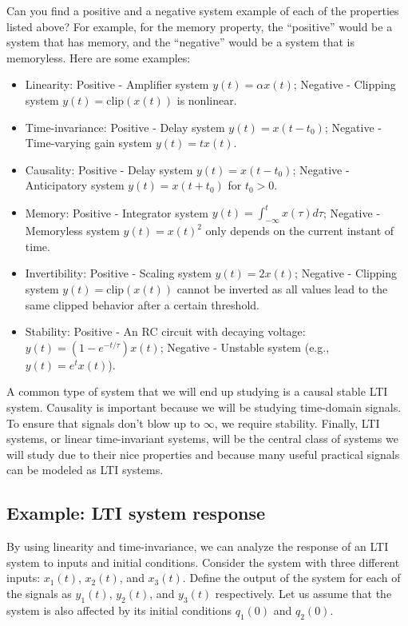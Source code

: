 \documentclass{ee102_notes}
\begin{document}
\begin{popquiz}
  Can you find a positive and a negative system example of each of the properties listed above? For example, for the memory property, the ``positive'' would be a system that has memory, and the ``negative'' would be a system that is memoryless. 
  \popqsplit
  Here are some examples:
  \begin{itemize}
      \item Linearity: Positive - Amplifier system $y(t) = \alpha x(t)$; Negative - Clipping system $y(t) = \text{clip}(x(t))$ is nonlinear.
      \item Time-invariance: Positive - Delay system $y(t) = x(t - t_0)$; Negative - Time-varying gain system $y(t) = t x(t)$.
      \item Causality: Positive - Delay system $y(t) = x(t - t_0)$; Negative - Anticipatory system $y(t) = x(t + t_0)$ for $t_0 >0$.
      \item Memory: Positive - Integrator system $y(t) = \int_{-\infty}^{t} x(\tau) d\tau$; Negative - Memoryless system $y(t) = x(t)^2$ only depends on the current instant of time.
      \item Invertibility: Positive - Scaling system $y(t) = 2x(t)$; Negative - Clipping system $y(t) = \text{clip}(x(t))$ cannot be inverted as all values lead to the same clipped behavior after a certain threshold.
      \item Stability: Positive - An RC circuit with decaying voltage: $y(t) = (1 - e^{-t/\tau}) x(t)$; Negative - Unstable system (e.g., $y(t) = e^{t} x(t)$).
  \end{itemize} 
\end{popquiz}
A common type of system that we will end up studying is a causal stable LTI system. Causality is important because we will be studying time-domain signals. To ensure that signals don't blow up to $\infty$, we require stability. Finally, LTI systems, or linear time-invariant systems, will be the central class of systems we will study due to their nice properties and because many useful practical signals can be modeled as LTI systems.
\subsection{Example: LTI system response}
By using linearity and time-invariance, we can analyze the response of an LTI system to inputs and initial conditions. Consider the system with three different inputs: $x_1(t)$, $x_2(t)$, and $x_3(t)$. Define the output of the system for each of the signals as $y_1(t)$, $y_2(t)$, and $y_3(t)$ respectively. Let us assume that the system is also affected by its initial conditions $q_1(0)$ and $q_2(0)$. 
\end{document}
